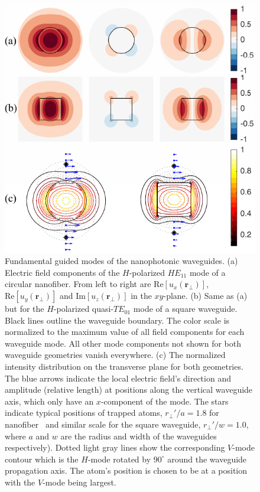 \documentclass[preprint,aps,pra,onecolumn,superscriptaddress]{revtex4-1} %
\def\br{\mathbf{r}}
\newcommand{\SWG}{square waveguide\xspace}%
\begin{document}
\begin{figure}[htb]
\centering
  \includegraphics[width=.49\textwidth]{fig/nanofiberswg_Hmode6}
  \caption{Fundamental guided modes of the nanophotonic waveguides. (a) Electric field components of the $H$-polarized $HE_{11}$ mode of a circular nanofiber. From left to right are $ \mathrm{Re}[u_x(\br\!_\perp)] $, $ \mathrm{Re}[u_y(\br\!_\perp)] $ and $ \mathrm{Im}[u_z(\br\!_\perp)] $ in the $ xy $-plane. (b) Same as (a) but for  the $H$-polarized quasi-$TE_{01}$ mode of a square waveguide. Black lines outline the waveguide boundary. The color scale is normalized to the maximum value of all field components for each waveguide mode. All other mode components not shown for both waveguide geometries vanish everywhere. (c) The normalized intensity distribution on the transverse plane for both geometries. The blue arrows indicate the local electric field's direction and amplitude (relative length) at positions along the vertical waveguide axis, which only have an $ x $-component of the mode. The stars indicate typical positions of trapped atoms, $r_\perp'/a=1.8  $ for nanofiber~\cite{Vetsch2010Optical} and similar scale for the \SWG,  $ r_\perp'/w=1.0 $, where $ a $ and $ w $ are the radius and width of the waveguides respectively). Dotted light gray lines show the corresponding $ V $-mode contour which is the $ H $-mode rotated by $ 90^\circ $ around the waveguide propagation axis. The atom's position is chosen to be at a position with the $V$-mode being largest. }\label{fig:nanofiberSWG_E_ints}
\end{figure}
\end{document}
